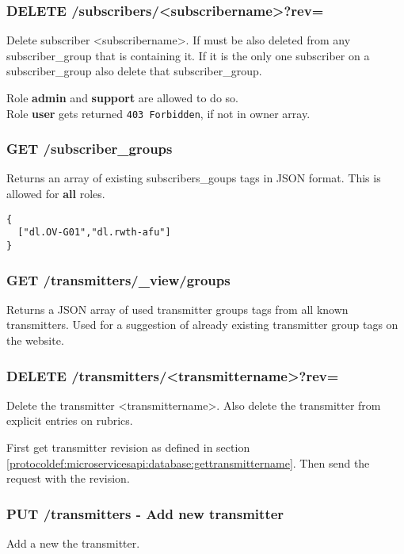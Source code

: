 \subsubsection{DELETE /subscribers/<subscribername>?rev=}
Delete subscriber <subscribername>. If must be also deleted from any subscriber\_group that is containing it. If it is the only one subscriber on a subscriber\_group also delete that subscriber\_group.

Role \textbf{admin} and \textbf{support} are allowed to do so.\\
Role \textbf{user} gets returned \verb|403 Forbidden|, if not in owner array.

\subsubsection{GET /subscriber\_groups}
Returns an array of existing subscribers\_goups tags in JSON format.
This is allowed for \textbf{all} roles.

\begin{lstlisting}
{
  ["dl.OV-G01","dl.rwth-afu"]
}
\end{lstlisting}

\subsubsection{GET /transmitters/\_view/groups}
Returns a JSON array of used transmitter groups tags from all known transmitters. Used for a suggestion of already existing transmitter group tags on the website.

\subsubsection{DELETE /transmitters/<transmittername>?rev=}
Delete the transmitter <transmittername>. Also delete the transmitter from explicit entries on rubrics.

First get transmitter revision as defined in section \ref{protocoldef:microservicesapi:database:gettransmittername}. Then send the request with the revision.

\subsubsection{PUT /transmitters - Add new transmitter}
Add a new the transmitter.

